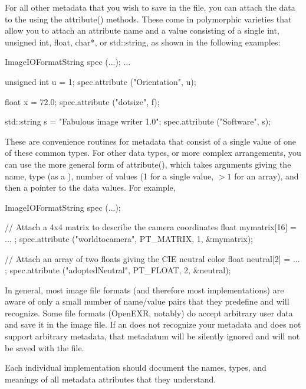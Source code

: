 For all other metadata that you wish to save in the file, you can attach
the data to the \ImageIOFormatSpec using the {\cf attribute()} methods.
These come in polymorphic varieties that allow you to attach an
attribute name and a value consisting of a single {\cf int}, {\cf
  unsigned int}, {\cf float}, {\cf char*}, or {\cf std::string}, as
shown in the following examples:

\begin{code}
        ImageIOFormatString spec (...);
        ...

        unsigned int u = 1;
        spec.attribute ("Orientation", u);

        float x = 72.0;
        spec.attribute ("dotsize", f);

        std::string s = "Fabulous image writer 1.0";
        spec.attribute ("Software", s);
\end{code}

These are convenience routines for metadata that consist of a single
value of one of these common types.  For other data types, or more
complex arrangements, you can use the more general form of {\cf
  attribute()}, which takes arguments giving the name, type (as a
\ParamBaseType), number of values (1 for a single value, $>1$ for an
  array), and then a pointer to the data values.  For example,

\begin{code}
        ImageIOFormatString spec (...);

        // Attach a 4x4 matrix to describe the camera coordinates
        float mymatrix[16] = { ... };
        spec.attribute ("worldtocamera", PT_MATRIX, 1, &mymatrix);

        // Attach an array of two floats giving the CIE neutral color
        float neutral[2] = { ... };
        spec.attribute ("adoptedNeutral", PT_FLOAT, 2, &neutral);
\end{code}

In general, most image file formats (and therefore most \ImageOutput
implementations) are aware of only a small number of name/value pairs
that they predefine and will recognize.  Some file formats (OpenEXR,
notably) do accept arbitrary user data and save it in the image file.
If an \ImageOutput does not recognize your metadata and does not support
arbitrary metadata, that metadatum will be silently ignored and will not
be saved with the file.

Each individual \ImageOutput implementation should document the names,
types, and meanings of all metadata attributes that they understand.


